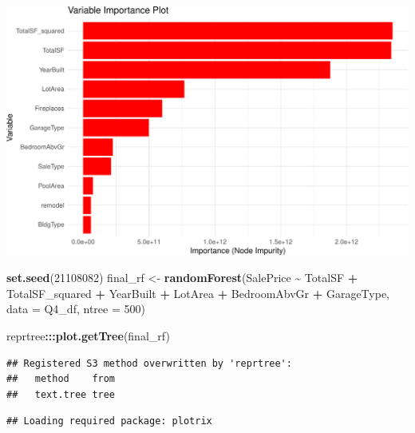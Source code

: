 \documentclass[
]{article}
\newenvironment{Shaded}{\begin{snugshade}}{\end{snugshade}}
\newcommand{\AttributeTok}[1]{\textcolor[rgb]{0.13,0.29,0.53}{#1}}
\newcommand{\DecValTok}[1]{\textcolor[rgb]{0.00,0.00,0.81}{#1}}
\newcommand{\FunctionTok}[1]{\textcolor[rgb]{0.13,0.29,0.53}{\textbf{#1}}}
\newcommand{\NormalTok}[1]{#1}
\newcommand{\OtherTok}[1]{\textcolor[rgb]{0.56,0.35,0.01}{#1}}
\newcommand{\SpecialCharTok}[1]{\textcolor[rgb]{0.81,0.36,0.00}{\textbf{#1}}}
\begin{document}
\includegraphics{STAT847_W24_Final_files/figure-latex/unnamed-chunk-15-1.pdf}
\newpage

\begin{Shaded}
\begin{Highlighting}[]
\FunctionTok{set.seed}\NormalTok{(}\DecValTok{21108082}\NormalTok{)}
\NormalTok{final\_rf }\OtherTok{\textless{}{-}} \FunctionTok{randomForest}\NormalTok{(SalePrice }\SpecialCharTok{\textasciitilde{}}\NormalTok{ TotalSF }\SpecialCharTok{+}
\NormalTok{    TotalSF\_squared }\SpecialCharTok{+}\NormalTok{ YearBuilt }\SpecialCharTok{+}\NormalTok{ LotArea }\SpecialCharTok{+}\NormalTok{ BedroomAbvGr }\SpecialCharTok{+}
\NormalTok{    GarageType, }\AttributeTok{data =}\NormalTok{ Q4\_df, }\AttributeTok{ntree =} \DecValTok{500}\NormalTok{)}

\NormalTok{reprtree}\SpecialCharTok{:::}\FunctionTok{plot.getTree}\NormalTok{(final\_rf)}
\end{Highlighting}
\end{Shaded}

\begin{verbatim}
## Registered S3 method overwritten by 'reprtree':
##   method    from
##   text.tree tree
\end{verbatim}

\begin{verbatim}
## Loading required package: plotrix
\end{verbatim}
\end{document}
